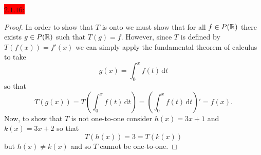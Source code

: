 \documentclass{exam}
\begin{document}
  \colorbox{red}{\underline{$2.1.16$}:}
  \begin{solution}
    \begin{proof}
      In order to show that $T$ is onto we must show that for all $f \in P(\mathbb R)$ there exists $g \in P(\mathbb R)$ such that $T(g) = f$. However, since $T$ is defined by $T(f(x)) = f'(x)$ we can simply apply the fundamental theorem of calculus to take 
      \[
        g(x) = \int_{0}^{x} f(t)\,\mathrm{d}t
      \]
      so that 
      \[
        T(g(x)) = T\left(\int_{0}^{x}f(t)\,\mathrm{d}t\right) = \left(\int_{0}^{x}f(t)\,\mathrm{d}t\right)' = f(x).
      \]
      Now, to show that $T$ is not one-to-one consider $h(x) = 3x + 1$ and $k(x) = 3x + 2$ so that 
      \[
        T(h(x)) = 3 = T(k(x)) 
      \]
      but $h(x) \neq k(x)$ and so $T$ cannot be one-to-one.
    \end{proof}
  \end{solution}
\end{document}
